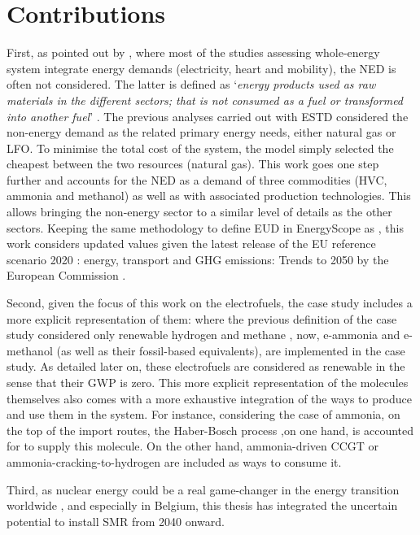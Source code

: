 \section*{Contributions}
\label{sec:cs:contributions}
First, as pointed out by \citet{rixhon2022integration}, where most of the studies assessing whole-energy system integrate energy demands (\ie electricity, heart and mobility), the \acrfull{NED} is often not considered. The latter is defined as ‘\textit{energy products used as raw materials in the different sectors; that is not consumed as a fuel or transformed into another fuel}’ \cite{Eurostat2019}. The previous analyses carried out with \gls{ESTD} considered the non-energy demand as the related primary energy needs, \ie either natural gas or \gls{LFO}. To minimise the total cost of the system, the model simply selected the cheapest between the two resources (\ie natural gas). This work goes one step further and accounts for the \gls{NED} as a demand of three commodities (\ie \gls{HVC}, ammonia and methanol) as well as with associated production technologies. This allows bringing the non-energy sector to a similar level of details as the other sectors.  Keeping the same methodology to define \gls{EUD} in EnergyScope as \citet{Limpens2020}, this work considers updated values given the latest release of the \og EU reference scenario 2020 : energy, transport and GHG emissions: Trends to 2050 \fg by the European Commission \cite{EuropeanCommission2021}.

Second, given the focus of this work on the electrofuels, the case study includes a more explicit representation of them: where the previous definition of the case study considered only renewable hydrogen and methane \cite{limpens2021generating}, now, e-ammonia and e-methanol (as well as their fossil-based equivalents), are implemented in the case study. As detailed later on, these electrofuels are considered as renewable in the sense that their \gls{GWP} is zero. This more explicit representation of the molecules themselves also comes with a more exhaustive integration of the ways to produce and use them in the system. For instance, considering the case of ammonia, on the top of the import routes, the Haber-Bosch process ,on one hand, is accounted for to supply this molecule. On the other hand, ammonia-driven \gls{CCGT} or ammonia-cracking-to-hydrogen are included as ways to consume it.

Third, as nuclear energy could be a real game-changer in the energy transition worldwide \cite{IEA2022nuclear}, and especially in Belgium, this thesis has integrated the uncertain potential to install \gls{SMR} from 2040 onward.

